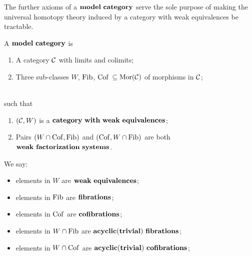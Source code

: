     \begin{note}
        The further axioms of a $\mbf{model\ category}$ serve the sole purpose of
        making the universal homotopy theory induced by
        a category with weak equivalences be tractable.

    \end{note}

    \begin{defn}
        A $\mbf{model\ category}$ is
        \begin{enumerate}
            \item A category $\mathcal{C}$ with limits and colimits;
            \item Three sub-classes $W$, $\mathrm{Fib}$, $\mathrm{Cof}$ $ \subseteq \operatorname{\rm{Mor}}(\mathcal{C})$ of morphisms in $\mathcal{C}$;
        \end{enumerate}
        \ \\
        such that
        \begin{enumerate}
            \item $(\mathcal{C}, W)$ is a $\mbf{category\ with\ weak\ equivalences}$;
            \item Pairs $(W \cap \mathrm{Cof}, \mathrm{Fib})$ and $(\mathrm{Cof}, W \cap \mathrm{Fib})$ are both
            $\mbf{weak\ factorization\ systems}$.
        \end{enumerate}

    \end{defn}

    \begin{note}
        We say:
        \begin{itemize}
            \item elements in $W$ are $\mbf{weak\ equivalences}$;
            \item elements in $\mathrm{Fib}$ are $\mathbf{fibrations}$;
            \item elements in $\mathrm{Cof}$ are $\mathbf{cofibrations}$;
            \item elements in $W \cap \mathrm{Fib}$ are $\mbf{acyclic(trivial)\ fibrations}$;
            \item elements in $W \cap \mathrm{Cof}$ are $\mbf{acyclic(trivial)\ cofibrations}$;
        \end{itemize}

    \end{note}

